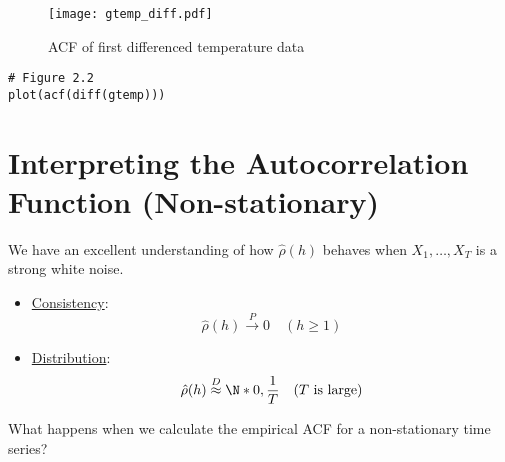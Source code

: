 \begin{figure}[!htbp]
    \centering
    \texttt{[image: gtemp\_diff.pdf]}
    \caption{ACF of first differenced temperature data}\label{fig:gtemp_diff}
\end{figure}
\begin{verbatim}
# Figure 2.2
plot(acf(diff(gtemp)))
\end{verbatim}

\section{Interpreting the Autocorrelation Function (Non-stationary)}
We have an excellent understanding of how $ \hat{\rho}(h) $
behaves when $ X_1,\ldots,X_T $ is a strong white noise.
\begin{itemize}
    \item \underline{Consistency}:
          \[ \hat{\rho}(h)\stackrel{P}{\to}0\quad(h\ge 1) \]
    \item \underline{Distribution}:
          \[ \hat{\rho}(h)\stackrel{D}{\approx}\N*{0,\frac{1}{T} }\quad (T\text{ is large}) \]
\end{itemize}
What happens when we calculate the empirical ACF for a non-stationary time
series?

